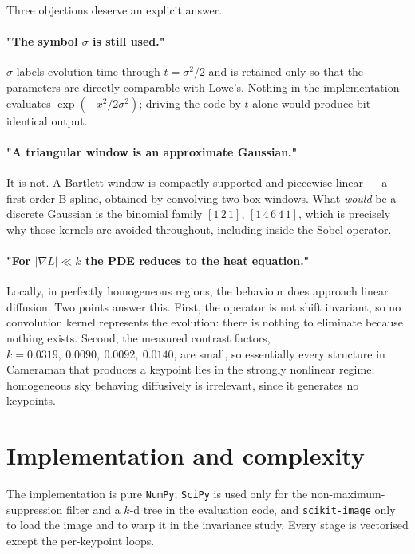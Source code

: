 \documentclass[11pt,a4paper]{article}
\newcommand{\Kvals}{0.0319,\ 0.0090,\ 0.0092,\ 0.0140}  %
\begin{document}
Three objections deserve an explicit answer.

\paragraph{"The symbol $\sigma$ is still used."}
$\sigma$ labels evolution time through $t=\sigma^2/2$ and is retained only so
that the parameters are directly comparable with Lowe's. Nothing in the
implementation evaluates $\exp(-x^{2}/2\sigma^{2})$; driving the code by $t$
alone would produce bit-identical output.

\paragraph{"A triangular window is an approximate Gaussian."}
It is not. A Bartlett window is compactly supported and piecewise linear --- a
first-order B-spline, obtained by convolving two box windows. What \emph{would}
be a discrete Gaussian is the binomial family $[1\,2\,1]$, $[1\,4\,6\,4\,1]$,
which is precisely why those kernels are avoided throughout, including inside
the Sobel operator.

\paragraph{"For $|\nabla L|\ll k$ the PDE reduces to the heat equation."}
Locally, in perfectly homogeneous regions, the behaviour does approach linear
diffusion. Two points answer this. First, the operator is not shift invariant,
so no convolution kernel represents the evolution: there is nothing to
eliminate because nothing exists. Second, the measured contrast factors,
$k=\Kvals$, are small, so essentially every structure in Cameraman that
produces a keypoint lies in the strongly nonlinear regime; homogeneous sky
behaving diffusively is irrelevant, since it generates no keypoints.

\section{Implementation and complexity}

The implementation is pure \texttt{NumPy}; \texttt{SciPy} is used only for the
non-maximum-suppression filter and a $k$-d tree in the evaluation code, and
\texttt{scikit-image} only to load the image and to warp it in the invariance
study. Every stage is vectorised except the per-keypoint loops.
\end{document}
